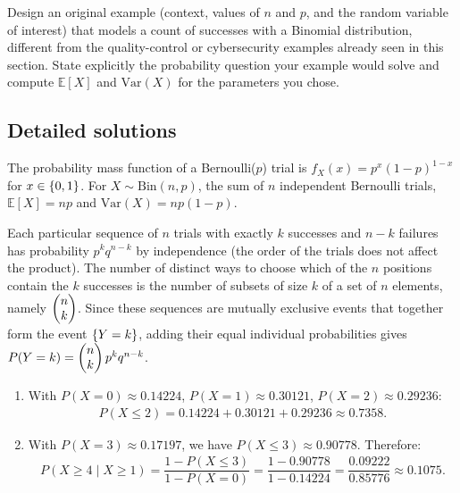 \begin{problema}
	\label{prob:3c14103}
	Design an original example (context, values of $n$ and $p$, and the random variable of interest) that models a count of successes with a Binomial distribution, different from the quality-control or cybersecurity examples already seen in this section. State explicitly the probability question your example would solve and compute $\mathbb{E}[X]$ and $\text{Var}(X)$ for the parameters you chose.
\end{problema}

\subsection*{Detailed solutions}

\begin{solproblema}[prob:71ce5a0]
	The probability mass function of a Bernoulli($p$) trial is $f_X(x) = p^x(1-p)^{1-x}$ for $x \in \left\{ 0,1 \right\}$. For $X \sim \text{Bin}(n,p)$, the sum of $n$ independent Bernoulli trials, $\mathbb{E}[X] = np$ and $\text{Var}(X) = np(1-p)$.
\end{solproblema}

\begin{solproblema}[prob:1149be6]
	Each particular sequence of $n$ trials with exactly $k$ successes and $n-k$ failures has probability $p^k q^{n-k}$ by independence (the order of the trials does not affect the product). The number of distinct ways to choose which of the $n$ positions contain the $k$ successes is the number of subsets of size $k$ of a set of $n$ elements, namely $\begin{pmatrix} n \\ k\end{pmatrix}$. Since these sequences are mutually exclusive events that together form the event $\left\{ Y=k \right\}$, adding their equal individual probabilities gives $P(Y=k) = \begin{pmatrix} n \\ k\end{pmatrix}p^k q^{n-k}$.
\end{solproblema}

\begin{solproblema}[prob:c3d2032]
	\begin{enumerate}
		\item With $P(X=0)\approx0.14224$, $P(X=1)\approx0.30121$, $P(X=2)\approx0.29236$:
		\begin{align*}
			P(X\le2) = 0.14224+0.30121+0.29236 \approx 0.7358.
		\end{align*}
		\item With $P(X=3)\approx0.17197$, we have $P(X\le3)\approx0.90778$. Therefore:
		\begin{align*}
			P(X\ge4\mid X\ge1) = \dfrac{1-P(X\le3)}{1-P(X=0)} = \dfrac{1-0.90778}{1-0.14224} = \dfrac{0.09222}{0.85776}\approx0.1075.
		\end{align*}
	\end{enumerate}
\end{solproblema}

